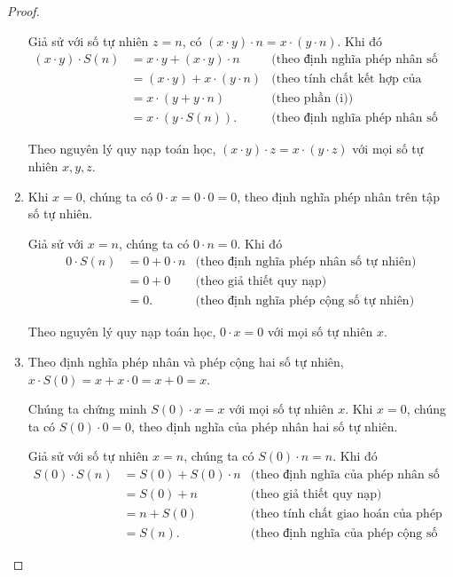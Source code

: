 \begin{proof}
\begin{enumerate}[label={(\roman*)}]
              Giả sử với số tự nhiên $z = n$, có $(x\cdot y)\cdot n = x\cdot (y\cdot n)$. Khi đó
              \begin{align*}
                  (x\cdot y)\cdot S(n) & = x\cdot y + (x\cdot y)\cdot n   & \text{(theo định nghĩa phép nhân số tự nhiên)}            \\
                                       & = (x\cdot y) + x\cdot (y\cdot n) & \text{(theo tính chất kết hợp của phép nhân số tự nhiên)} \\
                                       & = x\cdot (y + y\cdot n)          & \text{(theo phần (i))}                                    \\
                                       & = x\cdot (y\cdot S(n)).          & \text{(theo định nghĩa phép nhân số tự nhiên)}
              \end{align*}

              Theo nguyên lý quy nạp toán học, $(x\cdot y)\cdot z = x\cdot (y\cdot z)$ với mọi số tự nhiên $x, y, z$.
        \item Khi $x = 0$, chúng ta có $0\cdot x = 0\cdot 0 = 0$, theo định nghĩa phép nhân trên tập số tự nhiên.

              Giả sử với $x = n$, chúng ta có $0\cdot n = 0$. Khi đó
              \begin{align*}
                  0\cdot S(n) & = 0 + 0\cdot n & \text{(theo định nghĩa phép nhân số tự nhiên)} \\
                              & = 0 + 0        & \text{(theo giả thiết quy nạp)}                \\
                              & = 0.           & \text{(theo định nghĩa phép cộng số tự nhiên)}
              \end{align*}

              Theo nguyên lý quy nạp toán học, $0\cdot x = 0$ với mọi số tự nhiên $x$.
        \item Theo định nghĩa phép nhân và phép cộng hai số tự nhiên, $x\cdot S(0) = x + x\cdot 0 = x + 0 = x$.

              Chúng ta chứng minh $S(0)\cdot x = x$ với mọi số tự nhiên $x$. Khi $x = 0$, chúng ta có $S(0)\cdot 0 = 0$, theo định nghĩa của phép nhân hai số tự nhiên.

              Giả sử với số tự nhiên $x = n$, chúng ta có $S(0)\cdot n = n$. Khi đó
              \begin{align*}
                  S(0)\cdot S(n) & = S(0) + S(0)\cdot n & \text{(theo định nghĩa của phép nhân số tự nhiên)}          \\
                                 & = S(0) + n           & \text{(theo giả thiết quy nạp)}                             \\
                                 & = n + S(0)           & \text{(theo tính chất giao hoán của phép cộng số tự nhiên)} \\
                                 & = S(n).              & \text{(theo định nghĩa của phép cộng số tự nhiên)}
              \end{align*}


\end{enumerate}
\end{proof}

